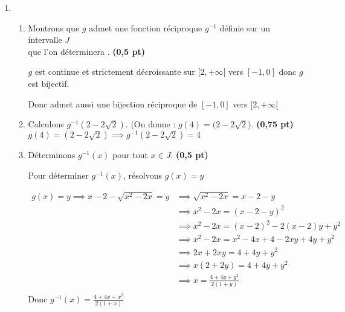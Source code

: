 \documentclass[12pt,a4paper]{article}
\begin{document}
\begin{enumerate}
\item[]
\begin{enumerate}
\item Montrons que \( g \) admet une fonction réciproque \( g^{-1} \) définie sur un intervalle \( J \)\\ que l’on déterminera . \hspace{1cm} \textbf{(0,5 pt)}
    
\( g \) est continue et strictement décroissante sur \( [2, +\infty[ \) vers \( [-1, 0] \) donc \( g \) est bijectif.

Donc admet aussi une bijection réciproque de \( [-1, 0] \) vers \( [2, +\infty[ \)
   \item Calculons \( g^{-1}(2 - 2\sqrt{2}) \). (On donne : \( g(4) = (2 - 2\sqrt{2} \)). \hspace{1cm} \textbf{(0,75 pt)}\\
    \( g(4) = (2 - 2\sqrt{2}) \implies g^{-1}(2 - 2\sqrt{2}) = 4\)
    \item Déterminons \( g^{-1}(x) \) pour tout \( x \in J \). \hspace{3cm} \textbf{(0,5 pt)}
    
    Pour déterminer \( g^{-1}(x) \), résolvons \( g(x) = y \)
    
    \begin{align*}
    g(x) = y \implies  x - 2 - \sqrt{x^2 - 2x} = y &\implies \sqrt{x^2 - 2x} = x - 2 - y\\
    																								&\implies x^2 - 2x = (x - 2 - y)^{2}\\
    																								&\implies x^2 - 2x = (x-2)^{2}-2(x-2)y+y^{2}\\
    																								&\implies x^2 - 2x = x^{2}-4x+4-2xy+4y+y^{2}\\
    																								&\implies 2x+2xy = 4+4y+y^{2}\\
    																								&\implies x(2+2y) = 4+4y+y^{2}\\
    																								&\implies x = \frac{4+4y+y^{2}}{2(1+y)}\\
		\end{align*}     
		Donc \(\boxed{ g^{-1}(x) = \frac{4+4x+x^{2}}{2(1+x)}}\)
\end{enumerate}
\end{enumerate}
\end{document}

